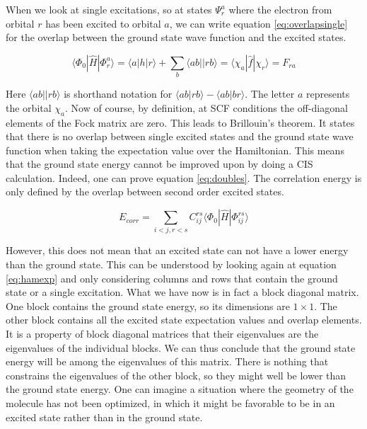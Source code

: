 \documentclass[twoside,twocolumn,9pt]{article}
\begin{document}
When we look at single excitations, so at states $\Psi_r^a$ where the electron from orbital $r$ has been excited to orbital $a$, we can write equation
\eqref{eq:overlapsingle}\cite{Szabo1996} for the overlap between the ground state wave function and the excited states.

\begin{equation}\label{eq:overlapsingle}
  \langle\Phi_0 |\hat{H}|\Phi_r^a\rangle = \langle a|h|r \rangle + \sum_b \langle ab||rb \rangle = \langle \chi_a |\hat{f}| \chi_r \rangle = F_{ra}
\end{equation}

Here $\langle ab||rb \rangle$ is shorthand notation for $\langle ab | rb \rangle - \langle ab | br \rangle$. The letter $a$ represents the orbital $\chi_a$.
Now of course, by definition, at SCF conditions the off-diagonal elements of the Fock matrix are zero. This leads to Brillouin's theorem. It states that there is no overlap
between single excited states and the ground state wave function when taking the expectation value over the Hamiltonian. This means that the ground state energy cannot be improved
upon by doing a CIS calculation. Indeed, one can prove equation \eqref{eq:doubles}\cite{Szabo1996}. The correlation energy is only defined by the overlap between second order
excited states.

\begin{equation}\label{eq:doubles}
  E_{corr} = \sum_{i<j, r<s} C_{ij}^{rs}\langle \Phi_{0} |\hat{H}|\Phi_{ij}^{rs}\rangle
\end{equation}

However, this does not mean that an excited state can not have a lower energy than the ground state. This can be understood by looking again at equation \eqref{eq:hamexp} and only
considering columns and rows that contain the ground state or a single excitation. What we have now is in fact a block diagonal matrix. One block contains the ground state energy, so
its dimensions are $1\times 1 $. The other block contains all the excited state expectation values and overlap elements. It is a property of block diagonal matrices that their
eigenvalues are the eigenvalues of the individual blocks. We can thus conclude that the ground state energy will be among the eigenvalues of this matrix. There is nothing that
constrains the eigenvalues of the other block, so they might well be lower than the ground state energy. One can imagine a situation where the geometry of the molecule has not been
optimized, in which it might be favorable to be in an excited state rather than in the ground state.
\end{document}
